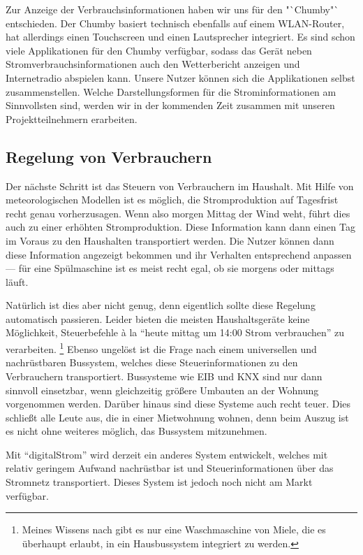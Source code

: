 \documentclass[12pt,BCOR=8.5mm]{scrartcl}
\begin{document}
Zur Anzeige der Verbrauchsinformationen haben wir uns für den
"`Chumby"` entschieden. Der Chumby basiert technisch
ebenfalls auf einem WLAN-Router, hat allerdings einen Touchscreen und
einen Lautsprecher integriert. Es sind schon viele Applikationen für den
Chumby verfügbar, sodass das Gerät neben Stromverbrauchsinformationen
auch den Wetterbericht anzeigen und Internetradio abspielen kann. Unsere
Nutzer können sich die Applikationen selbst zusammenstellen. Welche
Darstellungsformen für die Strominformationen am Sinnvollsten sind,
werden wir in der kommenden Zeit zusammen mit unseren Projektteilnehmern
erarbeiten.


\subsection{Regelung von Verbrauchern}\label{sub:steuern}

Der nächste Schritt ist das Steuern von Verbrauchern im Haushalt.
Mit Hilfe von meteorologischen Modellen ist es möglich, die
Stromproduktion auf Tagesfrist recht genau vorherzusagen. Wenn also
morgen Mittag der Wind weht, führt dies auch zu einer erhöhten
Stromproduktion. Diese Information kann dann einen Tag im Voraus zu den
Haushalten transportiert werden. Die Nutzer können dann diese
Information angezeigt bekommen und ihr Verhalten entsprechend anpassen
--- für eine Spülmaschine ist es meist recht egal, ob sie morgens oder
mittags läuft.

Natürlich ist dies aber nicht genug, denn eigentlich sollte diese
Regelung automatisch passieren. Leider bieten die meisten
Haushaltsgeräte keine Möglichkeit, Steuerbefehle à la "`heute mittag um
14:00 Strom verbrauchen"' zu verarbeiten. \footnote{Meines Wissens nach
gibt es nur eine Waschmaschine von Miele, die es überhaupt erlaubt, in
ein Hausbussystem integriert zu werden.} Ebenso ungelöst ist die Frage
nach einem universellen und nachrüstbaren Bussystem, welches diese
Steuerinformationen zu den Verbrauchern transportiert. Bussysteme wie
EIB und KNX sind nur dann sinnvoll einsetzbar, wenn gleichzeitig größere
Umbauten an der Wohnung vorgenommen werden. Darüber hinaus sind diese
Systeme auch recht teuer. Dies schließt alle Leute aus, die in einer
Mietwohnung wohnen, denn beim Auszug ist es nicht ohne weiteres
möglich, das Bussystem mitzunehmen.

Mit "`digitalStrom"' wird derzeit ein anderes System entwickelt, welches
mit relativ geringem Aufwand nachrüstbar ist und Steuerinformationen
über das Stromnetz transportiert. Dieses System ist jedoch noch nicht am
Markt verfügbar.
\end{document}
